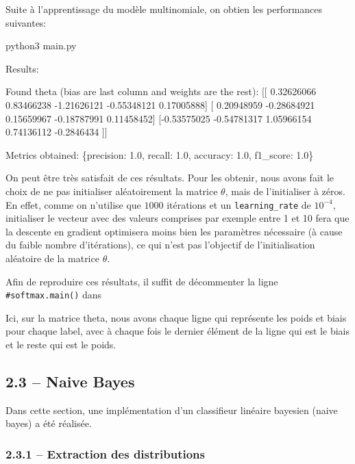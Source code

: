 \documentclass[
]{article}
\newenvironment{Shaded}{}{}
\newcommand{\NormalTok}[1]{#1}
\begin{document}
Suite à l'apprentissage du modèle multinomiale, on obtien les
performances suivantes:

\begin{Shaded}
\begin{Highlighting}[]
\NormalTok{python3 main.py}

\NormalTok{Results:}

\NormalTok{Found theta (bias are last column and weights are the rest):}
\NormalTok{[[ 0.32626066  0.83466238 {-}1.21626121 {-}0.55348121  0.17005888]}
\NormalTok{ [ 0.20948959 {-}0.28684921  0.15659967 {-}0.18787991  0.11458452]}
\NormalTok{ [{-}0.53575025 {-}0.54781317  1.05966154  0.74136112 {-}0.2846434 ]]}


\NormalTok{Metrics obtained:}
\NormalTok{\{\textquotesingle{}precision\textquotesingle{}: 1.0, \textquotesingle{}recall\textquotesingle{}: 1.0, \textquotesingle{}accuracy\textquotesingle{}: 1.0, \textquotesingle{}f1\_score\textquotesingle{}: 1.0\}}
\end{Highlighting}
\end{Shaded}

On peut être très satisfait de ces résultats. Pour les obtenir, nous
avons fait le choix de ne pas initialiser aléatoirement la matrice
\(\theta\), mais de l'initialiser à zéros. En effet, comme on n'utilise
que \(1000\) itérations et un \texttt{learning\_rate} de \(10^{-4}\),
initialiser le vecteur avec des valeurs comprises par exemple entre 1 et
10 fera que la descente en gradient optimisera moins bien les paramètres
nécessaire (à cause du faible nombre d'itérations), ce qui n'est pas
l'objectif de l'initialisation aléatoire de la matrice \(\theta\).

Afin de reproduire ces résultats, il suffit de décommenter la ligne
\texttt{\#softmax.main()} dans 

Ici, sur la matrice theta, nous avons chaque ligne qui représente les
poids et biais pour chaque label, avec à chaque fois le dernier élément
de la ligne qui est le biais et le reste qui est le poids.

\newpage{}

\subsection{2.3 -- Naive Bayes}\label{naive-bayes-1}

Dans cette section, une implémentation d'un classifieur linéaire
bayesien (naive bayes) a été réalisée.

\subsubsection{2.3.1 -- Extraction des
distributions}\label{extraction-des-distributions}
\end{document}
